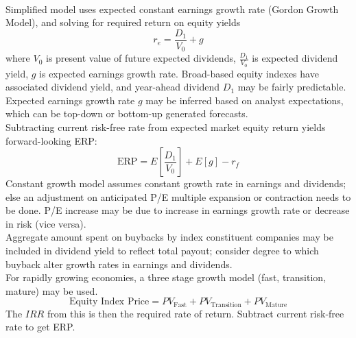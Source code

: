 \begin{method} \\
Simplified model uses expected constant earnings growth rate (Gordon Growth Model), and solving for required return on equity yields
\begin{equation}
r_e = \frac{D_1}{V_0} + g \nonumber
\end{equation}
where $V_0$ is present value of future expected dividends, $\frac{D_1}{V_0}$ is expected dividend yield, $g$ is expected earnings growth rate. Broad-based equity indexes have associated dividend yield, and year-ahead dividend $D_1$ may be fairly predictable. Expected earnings growth rate $g$ may be inferred based on analyst expectations, which can be top-down or bottom-up generated forecasts.\\
Subtracting current risk-free rate from expected market equity return yields forward-looking ERP:
\begin{equation}
\text{ERP} = E\left[\frac{D_1}{V_0}\right] + E[g] - r_f \nonumber 
\end{equation}
Constant growth model assumes constant growth rate in earnings and dividends; else an adjustment on anticipated P/E multiple expansion or contraction needs to be done. P/E increase may be due to increase in earnings growth rate or decrease in risk (vice versa). \\
Aggregate amount spent on buybacks by index constituent companies may be included in dividend yield to reflect total payout; consider degree to which buyback alter growth rates in earnings and dividends.\\
For rapidly growing economies, a three stage growth model (fast, transition, mature) may be used. 
\begin{equation}
\text{Equity Index Price} = PV_{\text{Fast}} + PV_{\text{Transition}} + PV_{\text{Mature}} \nonumber
\end{equation}
The $IRR$ from this is then the required rate of return. Subtract current risk-free rate to get ERP.
\end{method}

